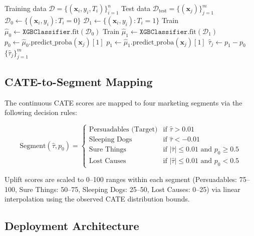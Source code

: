 \documentclass[11pt,a4paper,twoside]{article}
\begin{document}
\begin{algorithm}[H]
\caption{T-Learner XGBoost for Uplift Estimation}
\label{alg:tlearner}
\begin{algorithmic}[1]
\Require Training data $\mathcal{D} = \{(\mathbf{x}_i, y_i, T_i)\}_{i=1}^{n}$
\Require Test data $\mathcal{D}_{\text{test}} = \{(\mathbf{x}_j)\}_{j=1}^{m}$
\State $\mathcal{D}_0 \leftarrow \{(\mathbf{x}_i, y_i) : T_i = 0\}$ 
\State $\mathcal{D}_1 \leftarrow \{(\mathbf{x}_i, y_i) : T_i = 1\}$ 
\State Train $\hat{\mu}_0 \leftarrow \texttt{XGBClassifier}.\text{fit}(\mathcal{D}_0)$
\State Train $\hat{\mu}_1 \leftarrow \texttt{XGBClassifier}.\text{fit}(\mathcal{D}_1)$
    \State $p_0 \leftarrow \hat{\mu}_0.\text{predict\_proba}(\mathbf{x}_j)[1]$
    \State $p_1 \leftarrow \hat{\mu}_1.\text{predict\_proba}(\mathbf{x}_j)[1]$
    \State $\hat{\tau}_j \leftarrow p_1 - p_0$
\EndFor
\State \Return $\{\hat{\tau}_j\}_{j=1}^{m}$
\end{algorithmic}
\end{algorithm}

\subsection{CATE-to-Segment Mapping}

The continuous CATE scores are mapped to four marketing segments via the following decision rules:

\begin{equation}
\text{Segment}(\hat{\tau}, p_0) = 
\begin{cases}
\text{Persuadables (Target)} & \text{if } \hat{\tau} > 0.01 \\
\text{Sleeping Dogs} & \text{if } \hat{\tau} < -0.01 \\
\text{Sure Things} & \text{if } |\hat{\tau}| \leq 0.01 \text{ and } p_0 \geq 0.5 \\
\text{Lost Causes} & \text{if } |\hat{\tau}| \leq 0.01 \text{ and } p_0 < 0.5
\end{cases}
\label{eq:segment_mapping}
\end{equation}

Uplift scores are scaled to 0--100 ranges within each segment (Persuadables: 75--100, Sure Things: 50--75, Sleeping Dogs: 25--50, Lost Causes: 0--25) via linear interpolation using the observed CATE distribution bounds.

\subsection{Deployment Architecture}
\end{document}

